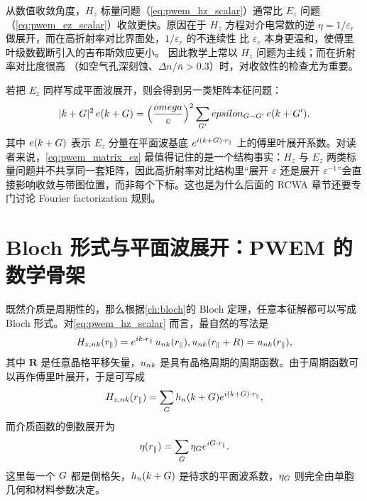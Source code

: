 从数值收敛角度，$H_z$ 标量问题（\cref{eq:pwem_hz_scalar}）通常比
$E_z$ 问题（\cref{eq:pwem_ez_scalar}）收敛更快。原因在于 $H_z$ 方程对介电常数的逆
$\eta=1/\varepsilon_r$ 做展开，而在高折射率对比界面处，$1/\varepsilon_r$ 的不连续性
比 $\varepsilon_r$ 本身更温和，使傅里叶级数截断引入的吉布斯效应更小\cite{li1996,johnson2001}。
因此教学上常以 $H_z$ 问题为主线；而在折射率对比度很高
（如空气孔深刻蚀、$\Delta n/\bar n > 0.3$）时，对收敛性的检查尤为重要。

若把 $E_z$ 同样写成平面波展开，则会得到另一类矩阵本征问题：
\begin{equation}
|k+G|^2\,e(k+G)
=
\left(\frac{omega}{c}\right)^2
\sum_{G'}
epsilon_{G-G'}\,e(k+G').
\label{eq:pwem_matrix_ez}
\end{equation}
其中 $e(k+G)$ 表示 $E_z$ 分量在平面波基底 $e^{i(k+G)\cdot r_\parallel}$ 上的傅里叶展开系数。对读者来说，\cref{eq:pwem_matrix_ez} 最值得记住的是一个结构事实：$H_z$ 与 $E_z$ 两类标量问题并不共享同一套矩阵，因此高折射率对比结构里“展开 $\varepsilon$ 还是展开 $\varepsilon^{-1}$”会直接影响收敛与带图位置，而非每个下标。这也是为什么后面的 RCWA 章节还要专门讨论 Fourier factorization 规则。

\section{Bloch 形式与平面波展开：PWEM 的数学骨架}
既然介质是周期性的，那么根据\cref{ch:bloch}的 Bloch 定理，任意本征解都可以写成 Bloch 形式。对\cref{eq:pwem_hz_scalar} 而言，最自然的写法是
\begin{equation}
H_{z,n\kvec}(\rvec_{\parallel})
=
\ee^{\ii\kvec\cdot\rvec_{\parallel}}
\,u_{n\kvec}(\rvec_{\parallel}),
\qquad
u_{n\kvec}(\rvec_{\parallel}+\bm R)=u_{n\kvec}(\rvec_{\parallel}),
\label{eq:hz_bloch_form}
\end{equation}
其中 $\bm R$ 是任意晶格平移矢量，$u_{nk}$ 是具有晶格周期的周期函数。由于周期函数可以再作傅里叶展开，于是可写成
\begin{equation}
H_{z,nk}(r_{\parallel})
=
\sum_{G}
 h_n(k+G)
 e^{i(k+G)\cdot r_{\parallel}},
\label{eq:hz_plane_wave_expand}
\end{equation}
而介质函数的倒数展开为
\begin{equation}
\eta(r_{\parallel})
=
\sum_{G}
\eta_{G}
e^{iG\cdot r_{\parallel}}.
\label{eq:eta_fourier_expand}
\end{equation}
这里每一个 $G$ 都是倒格矢，$h_n(k+G)$ 是待求的平面波系数，$\eta_{G}$ 则完全由单胞几何和材料参数决定。

